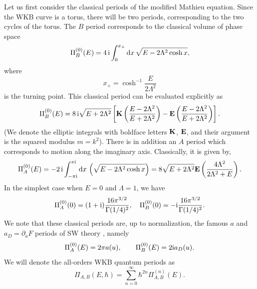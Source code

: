 \documentclass[a4paper,11pt]{article}
\theoremstyle{definition}
\newcommand{\ri}{{\rm i}}
\newcommand{\rd}{{\rm d}}
\newcommand{\be}{\begin{equation}}
\newcommand{\ee}{\end{equation}}
\begin{document}
Let us first consider the classical periods of the modified Mathieu
equation. Since the WKB curve is a torus, there will be two periods,
corresponding to the two cycles of the torus.  The $B$ period
corresponds to the classical volume of phase space
%
\begin{equation}\label{eq:PiB0}
  \Pi_B^{(0)}(E)=4\,\ri\int_0^{x_+} \rd x \, \sqrt{E-2\Lambda^2 \cosh
    x},\ee 
  where 
  \be x_+=\cosh^{-1} \frac{E}{2\Lambda^2}
\end{equation}
%
is the turning point. This classical period can be evaluated
explicitly as
% 
\begin{equation}\label{PB0}
  \Pi_B^{(0)}(E)=8\,\ri\sqrt{E+2\Lambda^2} \left[ {\bf K}\left(
      \frac{E-2\Lambda^2}{E+2\Lambda^2} \right) 
    -{\bf E} \left( \frac{E-2\Lambda^2}{E+2\Lambda^2} \right) \right].
\end{equation}
%
(We denote the elliptic integrals with boldface letters ${\bf K}$,
${\bf E}$, and their argument is the squared modulus $m=k^2$).  There
is in addition an $A$ period which corresponds to motion along the
imaginary axis. Classically, it is given by,
%
\begin{equation}\label{eq:PiA0}
  \Pi_A^{(0)}(E)
  = %
  -2\,\ri
  \int_{-\pi \ri }^{\pi \ri } \rd x \,
  \left(  \sqrt{E-2\Lambda^2 \cosh x}  \right) 
  =8 {\sqrt{E+2\Lambda^2}}  {\bf E} \left( {4
      \Lambda^2 \over 2 \Lambda^2+E} \right).  
\end{equation}
%
In the simplest case when $E=0$ and $\Lambda=1$, we have
%
\begin{equation}
  \Pi_A^{(0)}(0) = (1+\ri) \frac{16\pi^{3/2}}{\Gamma(1/4)^2},\quad
  \Pi_B^{(0)}(0) = -\ri \frac{16\pi^{3/2}}{\Gamma(1/4)^2} .
\end{equation}
%
We note that these classical periods are, up to normalization, the
famous $a$ and $a_D=\partial_a F$ periods of SW theory \cite{sw},
namely
%
\be
\label{abcpe}  
\Pi^{(0)}_A(E)=2 \pi a(u), \qquad \Pi_B^{(0)}(E) ={ 2 \ri }a_D(u). 
\ee
%
We will denote the all-orders WKB quantum periods as
%
\begin{equation}
  \label{QP}  \Pi_{A, B} (E,\hbar) =\sum_{n=0}^\infty \hbar^{2n} \Pi_{A, B}^{(n)} (E). 
\end{equation}
%
\end{document}

